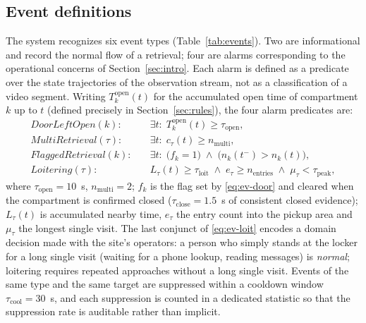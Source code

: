\documentclass[journal,article,submit,oneauthor]{Definitions/mdpi}
\begin{document}
\subsection{Event definitions}
\label{sec:events}
The system recognizes six event types (Table~\ref{tab:events}). Two are informational and
record the normal flow of a retrieval; four are alarms corresponding to the operational
concerns of Section~\ref{sec:intro}. Each alarm is defined as a predicate over the state
trajectories of the observation stream, not as a classification of a video segment. Writing
$T^{\mathrm{open}}_k(t)$ for the accumulated open time of compartment $k$ up to $t$ (defined
precisely in Section~\ref{sec:rules}), the four alarm predicates are:
\begin{align}
\textit{DoorLeftOpen}(k):&\quad
\exists t:\; T^{\mathrm{open}}_k(t)\ge \tau_{\mathrm{open}},
\label{eq:ev-door}\\[2pt]
\textit{MultiRetrieval}(\tau):&\quad
\exists t:\; c_\tau(t)\ge n_{\mathrm{multi}},
\label{eq:ev-multi}\\[2pt]
\textit{FlaggedRetrieval}(k):&\quad
\exists t:\; \bigl(f_k=1\bigr)\;\wedge\;\bigl(n_k(t^-)>n_k(t)\bigr),
\label{eq:ev-flag}\\[2pt]
\textit{Loitering}(\tau):&\quad
L_\tau(t)\ge \tau_{\mathrm{loit}}\;\wedge\; e_\tau\ge n_{\mathrm{entries}}
\;\wedge\; \mu_\tau<\tau_{\mathrm{peak}},
\label{eq:ev-loit}
\end{align}
where $\tau_{\mathrm{open}}=10$~s, $n_{\mathrm{multi}}=2$; $f_k$ is the flag set by
\eqref{eq:ev-door} and cleared when the compartment is confirmed closed
($\tau_{\mathrm{close}}=1.5$~s of consistent closed evidence); $L_\tau(t)$ is accumulated
nearby time, $e_\tau$ the entry count into the pickup area and $\mu_\tau$ the longest single
visit. The last conjunct of \eqref{eq:ev-loit} encodes a domain decision made with the site's
operators: a person who simply stands at the locker for a long single visit (waiting for a
phone lookup, reading messages) is \emph{normal}; loitering requires repeated approaches
without a long single visit. Events of the same type and the same target are suppressed
within a cooldown window $\tau_{\mathrm{cool}}=30$~s, and each suppression is counted in a
dedicated statistic so that the suppression rate is auditable rather than implicit.
\end{document}
